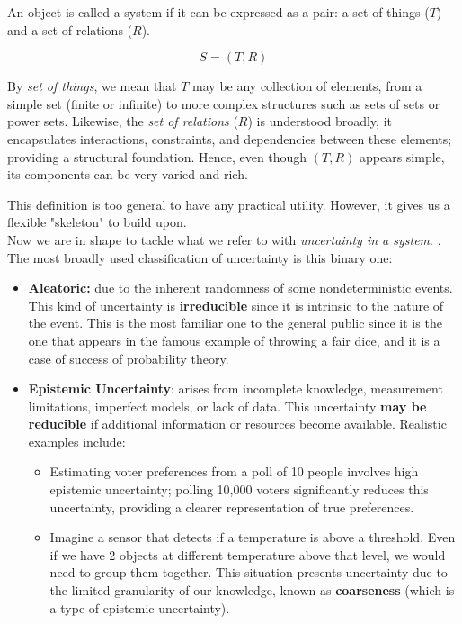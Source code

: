 \begin{definition}[System]
    An object is called a system if it can be expressed as a pair: a set of things ($T$) and a set of relations ($R$).

    \[S = (T,R)\]
\end{definition}

\begin{remark}
    By \emph{set of things}, we mean that \(T\) may be any collection of elements, from a simple set (finite or infinite) to more complex structures such as sets of sets or power sets. Likewise, the \emph{set of relations} (\(R\)) is understood broadly, it encapsulates interactions, constraints, and dependencies between these elements; providing a structural foundation. Hence, even though \((T, R)\) appears simple, its components can be very varied and rich.
\end{remark}

This definition is too general to have any practical utility. However, it gives us a flexible "skeleton" to build upon.\\

Now we are in shape to tackle what we refer to with \textit{uncertainty in a system}. \cite{UncertaintySciences}. The most broadly used classification of uncertainty is this binary one:\\

\begin{itemize}
    \item \textbf{Aleatoric:} due to the inherent randomness of some nondeterministic events. This kind of uncertainty is \textbf{irreducible} since it is intrinsic to the nature of the event. This is the most familiar one to the general public since it is the one that appears in the famous example of throwing a fair dice, and it is a case of success of probability theory.
    \item \textbf{Epistemic Uncertainty}: arises from incomplete knowledge, measurement limitations, imperfect models, or lack of data. This uncertainty \textbf{may be reducible} if additional information or resources become available. Realistic examples include: 
    \begin{itemize} 
        \item Estimating voter preferences from a poll of 10 people involves high epistemic uncertainty; polling 10,000 voters significantly reduces this uncertainty, providing a clearer representation of true preferences. 
        \item Imagine a sensor that detects if a temperature is above a threshold. Even if we have 2 objects at different temperature above that level, we would need to group them together. This situation presents uncertainty due to the limited granularity of our knowledge, known as \textbf{coarseness} (which is a type of epistemic uncertainty).
    \end{itemize} 
\end{itemize}


